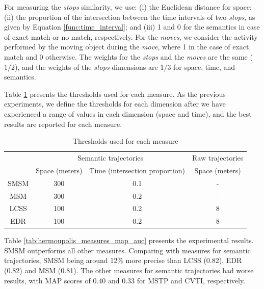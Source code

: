 \documentclass[12pt]{article}
\begin{document}

For measuring the \emph{stops} similarity, we use: (i) the Euclidean distance for space; (ii) the proportion of the intersection between the time intervals of two \emph{stops}, as given by Equation \ref{func:time_interval}; and (iii) 1 and 0 for the semantics in case of exact match or no match, respectively. For the \emph{moves}, we consider the activity performed by the moving object during the \emph{move}, where 1 in the case of exact match and 0 otherwise. The weights for the \emph{stops} and the \emph{moves} are the same ($1/2$), and the weights of the \emph{stops} dimensions are $1/3$ for space, time, and semantics.

Table \ref{tab:hermoupolis_thresholds} presents the thresholds used for each measure. As the previous experiments, we define the thresholds for each dimension after we have experienced a range of values in each dimension (space and time), and the best results are reported for each measure.

\begin{table}[!h]
\scriptsize
  \centering
  \begin{tabular}{|c|c|c|c|}
  	\hline
  & \multicolumn{2}{c|}{Semantic trajectories} & \multicolumn{1}{c|}{Raw trajectories} \\
 	\cline{2-4}
  & Space (meters)& Time (intersection proportion) & Space (meters) \\
  	\hline
 SMSM & 300 & 0.1 & - \\
 MSM & 300 & 0.2 & - \\
 LCSS & 100 & 0.2 & 8 \\
 EDR & 100 & 0.2 & 8 \\
    \hline
  \end{tabular}
  \caption{Thresholds used for each measure}
  \label{tab:hermoupolis_thresholds}
\end{table}

Table \ref{tab:hermoupolis_measures_map_auc} presents the experimental results. SMSM outperforms all other measures. Comparing with measures for semantic trajectories, SMSM being around 12\% more precise than LCSS (0.82), EDR (0.82) and MSM (0.81). The other measures for semantic trajectories had worse results, with MAP scores of 0.40 and 0.33 for MSTP and CVTI, respectively. 
\end{document}
